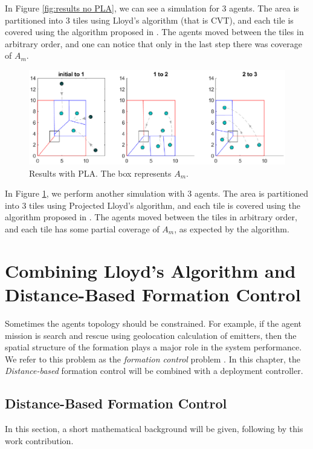 \documentclass{iacas}
\begin{document}
In Figure \ref{fig:results no PLA}, we can see a simulation for 3 agents. The area is partitioned into 3 tiles using Lloyd's algorithm (that is CVT), and each tile is covered using the algorithm proposed in \cite{Cortes2004}. The agents moved between the tiles in arbitrary order, and one can notice that only in the last step there was coverage of $A_m$.

\begin{figure}[H]
\includegraphics[scale=0.8]{figures/proposed-sol/results/sim2-3agents-3partitions-PLA.eps}
\caption{Results with PLA. The box represents $A_m$.}
\label{fig:results PLA}
\end{figure}

In Figure \ref{fig:results PLA}, we perform another simulation with 3 agents. The area is partitioned into 3 tiles using Projected Lloyd's algorithm, and each tile is covered using the algorithm proposed in \cite{Cortes2004}. The agents moved between the tiles in arbitrary order, and each tile has some partial coverage of $A_m$, as expected by the algorithm.

\section{Combining Lloyd's Algorithm and Distance-Based Formation Control}
Sometimes the agents topology should be constrained. For example, if the agent mission is search and rescue using geolocation calculation of emitters, then the spatial structure of the formation plays a major role in the system performance. We refer to this problem as the \emph{formation control} problem \cite{Oh2015}. In this chapter, the \emph{Distance-based} formation control will be combined with a deployment controller.%

\subsection{Distance-Based Formation Control}
In this section, a short mathematical background will be given, following by this work contribution. 
\end{document}

